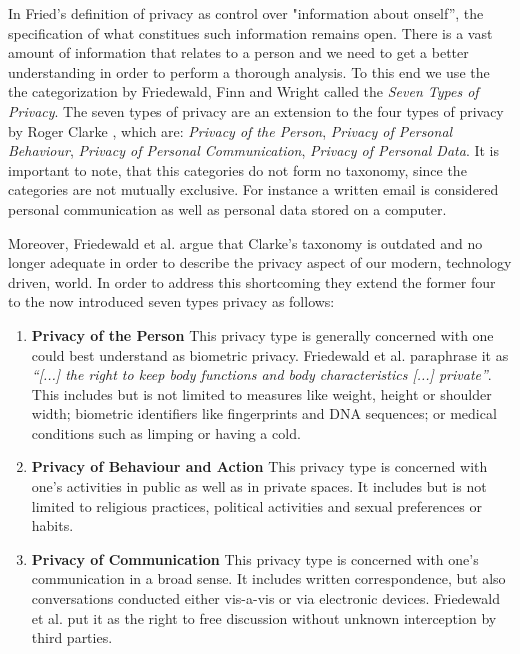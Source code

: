 \documentclass[runningheads,a4paper]{llncs}
\newenvironment{LGContent-Hidden}{ \comment  }{ }
\newcommand{\om}{[...]\xspace} %
\begin{document}
\begin{LGContent-Hidden}
In Fried's definition of privacy as control over "information about onself'', the specification of what constitues such information remains open.
There is a vast amount of information that relates to a person and we need to get a better understanding in order to perform a thorough analysis.
To this end we use the the categorization by Friedewald, Finn and Wright \cite{7ToP} called the \textit{Seven Types of Privacy}.
The seven types of privacy are an extension to the four types of privacy by Roger Clarke \cite{RClarke:4ToP}, which are:
\textit{Privacy of the Person},
\textit{Privacy of Personal Behaviour},
\textit{Privacy of Personal Communication},
\textit{Privacy of Personal Data}.
It is important to note, that this categories do not form no taxonomy, since the categories are not mutually exclusive.
For instance a written email is considered personal communication as well as personal data stored on a computer.

Moreover, Friedewald et al. argue that Clarke's taxonomy is outdated and no longer adequate in order to describe the privacy aspect of our modern, technology driven, world.
In order to address this shortcoming they extend the former four to the now introduced seven types privacy as follows:

\begin{enumerate}

\item \textbf{Privacy of the Person}
This privacy type is generally concerned with one could best understand as biometric privacy.
Friedewald et al. paraphrase it as \emph{``\om the right to keep body functions and body characteristics \om private''}.
This includes but is not limited to measures like weight, height or shoulder width;
biometric identifiers like fingerprints and DNA sequences;
or medical conditions such as limping or having a cold.


\item \textbf{Privacy of Behaviour and Action}
This privacy type is concerned with one's activities in public as well as in private spaces.
It includes but is not limited to religious practices, political activities and sexual preferences or habits.


\item \textbf{Privacy of Communication}
This privacy type is concerned with one's communication in a broad sense.
It includes written correspondence, but also conversations conducted either vis-a-vis or via electronic devices.
Friedewald et al. put it as the right to free discussion without unknown interception by third parties.



\end{enumerate}
\end{LGContent-Hidden}
\end{document}
